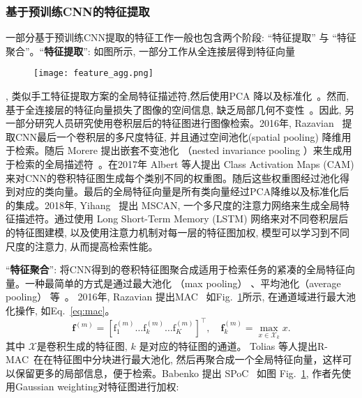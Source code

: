 \subsubsection{基于预训练CNN的特征提取}
一部分基于预训练CNN提取的特征工作一般也包含两个阶段: ``特征提取'' 与 ``特征聚合''。``\textbf{特征提取}'': 如图所示, 一部分工作从全连接层得到特征向量
\begin{figure}[!htp]
    \centering
    \texttt{[image: feature\_agg.png]} \\
      {}
   \label{fig:featureagg}
\end{figure}
, 类似手工特征提取方案的全局特征描述符,然后使用PCA 降以及标准化~\cite{sharif2014cnn,gong2014multi}。然而, 基于全连接层的特征向量损失了图像的空间信息, 缺乏局部几何不变性~\cite{gong2014multi}。因此, 另一部分研究人员研究使用卷积层后的特征图进行图像检索。2016年, Razavian~\cite{razavian2016visual} 提取CNN最后一个卷积层的多尺度特征, 并且通过空间池化(spatial pooling) 降维用于检索。随后 Morere 提出嵌套不变池化 （nested invariance pooling ）来生成用于检索的全局描述符~\cite{morere2017nested}。在2017年 Albert \cite{jimenez2017class} 等人提出 Class Activation Maps (CAM) 来对CNN的卷积特征图生成每个类别不同的权重图。随后这些权重图经过池化得到对应的类向量。最后的全局特征向量是所有类向量经过PCA降维以及标准化后的集成。2018年, Yihang~\cite{lou2018multi} 提出 MSCAN, 一个多尺度的注意力网络来生成全局特征描述符。通过使用 Long Short-Term Memory (LSTM) 网络来对不同卷积层后的特征图建模, 以及使用注意力机制对每一层的特征图加权, 模型可以学习到不同尺度的注意力, 从而提高检索性能。\par
``\textbf{特征聚合}'': 将CNN得到的卷积特征图聚合成适用于检索任务的紧凑的全局特征向量。一种最简单的方式是通过最大池化 （max pooling） 、平均池化（average pooling） 等~\cite{razavian2016visual, pang2018unifying}。
2016年, Razavian 提出MAC~\cite{razavian2016visual} 如Fig.~\ref{fig:featureagg}所示, 在通道域进行最大池化操作, 如Eq.~\ref{eq:mac}。
\begin{equation}
    \mathbf{f}^{(m)}=\left[\mathrm{f}_1^{(m)} \ldots \mathrm{f}_k^{(m)} \ldots \mathrm{f}_K^{(m)}\right]^{\top}, \quad \mathbf{f}_k^{(m)}=\max _{x \in \mathcal{X}_k} x.
    \label{eq:mac}
\end{equation}
其中 $\mathcal{X}$是卷积生成的特征图, $k$ 是对应的特征图的通道。
Tolias 等人提出R-MAC~\cite{tolias2015particular}在在特征图中分块进行最大池化, 然后再聚合成一个全局特征向量，这样可以保留更多的局部信息，便于检索。Babenko 提出 SPoC~\cite{babenko2015aggregating} 如图 Fig.~\ref{fig:featureagg}, 作者先使用Gaussian weighting对特征图进行加权:
